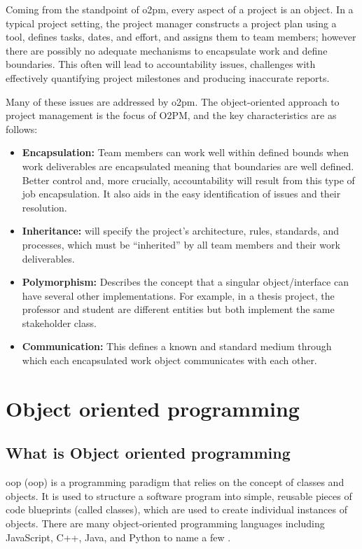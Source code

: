 Coming from the standpoint of \ac{o2pm}, every aspect of a project is an object. In a typical project setting, the project manager constructs a project plan using a tool, defines tasks, dates, and effort, and assigns them to team members; however there are possibly no adequate mechanisms to encapsulate work and define boundaries. This often will lead to accountability issues, challenges with effectively quantifying project milestones and producing inaccurate reports.

Many of these issues are addressed by \ac{o2pm}. The object-oriented approach to project management is the focus of O2PM, and the key characteristics are as follows:

\begin{itemize}
  \item \textbf{Encapsulation:} Team members can work well within defined bounds when work deliverables are encapsulated meaning that boundaries are well defined. Better control and, more crucially, accountability will result from this type of job encapsulation. It also aids in the easy identification of issues and their resolution.
  \item \textbf{Inheritance:} will specify the project's architecture, rules, standards, and processes, which must be “inherited” by all team members and their work deliverables.
  \item \textbf{Polymorphism:} Describes the concept that a singular object/interface can have several other implementations. For example, in a thesis project, the professor and student are different entities but both implement the same stakeholder class.
  \item \textbf{Communication:} This defines a known and standard medium through which each encapsulated work object communicates with each other.
\end{itemize}

\section{Object oriented programming}
\subsection{What is Object oriented programming}
\acl{oop} (\acs{oop}) is a programming paradigm that relies on the concept of classes and objects. It is used to structure a software program into simple, reusable pieces of code blueprints (called classes), which are used to create individual instances of objects. There are many object-oriented programming languages including JavaScript, C++, Java, and Python to name a few \cite{educative}.

